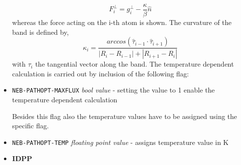 \documentclass[10pt,a4paper]{article} %
\begin{document}
\begin{itemize}
	\begin{equation}
	F^{\bot}_{i}=g^{\bot}_{i} - \frac{\kappa}{\beta} \hat{n}
	\end{equation}
	whereas the force acting on the i-th atom is shown. The curvature of the band is defined by,	
	\begin{equation}
	\kappa_{i}=\frac{arccos(\hat{\tau}_{i-1}\cdot\hat{\tau}_{i+1})}{\left|R_{i}-R_{i-1}\right|+\left|R_{i+1}-R_{i}\right|}
	\end{equation}
	with $\tau_{i}$ the tangential vector along the band. The temperature dependent calculation is carried out by inclusion of the following flag:
	
	\item \texttt{NEB-PATHOPT-MAXFLUX}  \textit{bool value} - setting the value to 1 enable the temperature dependent calculation \newline
	
	Besides this flag also the temperature values have to be assigned using the specific flag. \newline
	
	\item \texttt{NEB-PATHOPT-TEMP} \textit{floating point value} - assigns temperature value in K
	
	
	
	
	\item \textbf{IDPP} 
	

\end{itemize}
\end{document}
